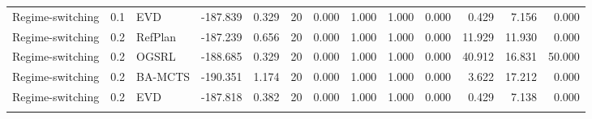 \documentclass[10pt]{article}
\begin{document}
\begin{landscape}
\begin{center}
\begin{longtable}{@{}lllr@{}r@{}r@{}rrrrrrr@{}}
Regime-switching & 0.1 & EVD & -187.839 & 0.329 & 20 & 0.000 & 1.000 & 1.000 & 0.000 & 0.429 & 7.156 & 0.000 \\
\addlinespace[1.5pt]
Regime-switching & 0.2 & RefPlan & -187.239 & 0.656 & 20 & 0.000 & 1.000 & 1.000 & 0.000 & 11.929 & 11.930 & 0.000 \\
Regime-switching & 0.2 & OGSRL & -188.685 & 0.329 & 20 & 0.000 & 1.000 & 1.000 & 0.000 & 40.912 & 16.831 & 50.000 \\
Regime-switching & 0.2 & BA-MCTS & -190.351 & 1.174 & 20 & 0.000 & 1.000 & 1.000 & 0.000 & 3.622 & 17.212 & 0.000 \\
Regime-switching & 0.2 & EVD & -187.818 & 0.382 & 20 & 0.000 & 1.000 & 1.000 & 0.000 & 0.429 & 7.138 & 0.000 \\
\addlinespace[1.5pt]
\end{longtable}
\end{center}
\end{landscape}
\end{document}
